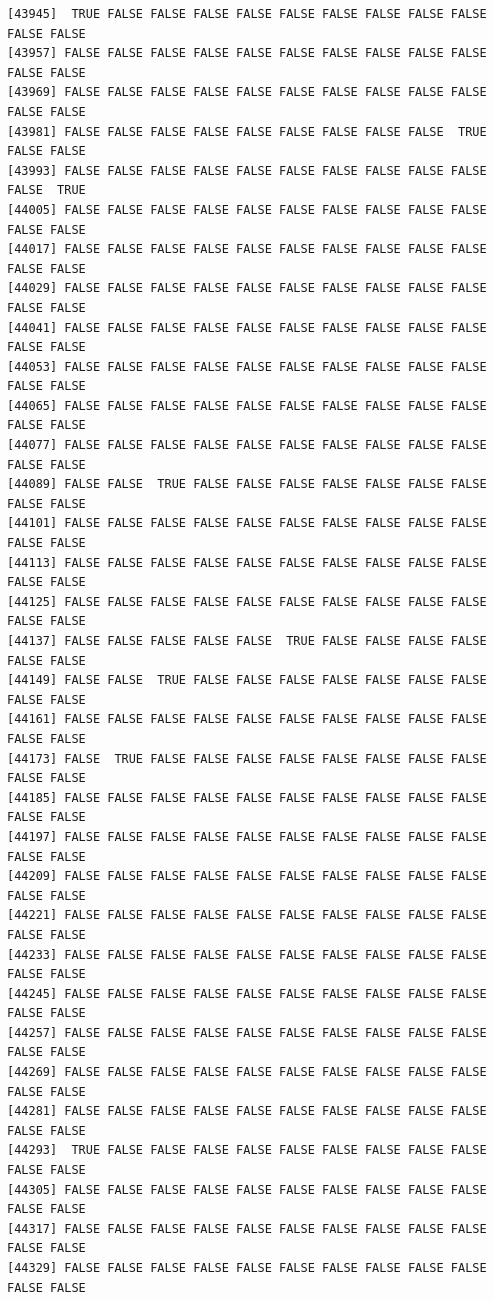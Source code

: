 \documentclass[
  a4paper,
  DIV=11,
  numbers=noendperiod]{scrartcl}
\begin{document}
\begin{verbatim}
[43945]  TRUE FALSE FALSE FALSE FALSE FALSE FALSE FALSE FALSE FALSE FALSE FALSE
[43957] FALSE FALSE FALSE FALSE FALSE FALSE FALSE FALSE FALSE FALSE FALSE FALSE
[43969] FALSE FALSE FALSE FALSE FALSE FALSE FALSE FALSE FALSE FALSE FALSE FALSE
[43981] FALSE FALSE FALSE FALSE FALSE FALSE FALSE FALSE FALSE  TRUE FALSE FALSE
[43993] FALSE FALSE FALSE FALSE FALSE FALSE FALSE FALSE FALSE FALSE FALSE  TRUE
[44005] FALSE FALSE FALSE FALSE FALSE FALSE FALSE FALSE FALSE FALSE FALSE FALSE
[44017] FALSE FALSE FALSE FALSE FALSE FALSE FALSE FALSE FALSE FALSE FALSE FALSE
[44029] FALSE FALSE FALSE FALSE FALSE FALSE FALSE FALSE FALSE FALSE FALSE FALSE
[44041] FALSE FALSE FALSE FALSE FALSE FALSE FALSE FALSE FALSE FALSE FALSE FALSE
[44053] FALSE FALSE FALSE FALSE FALSE FALSE FALSE FALSE FALSE FALSE FALSE FALSE
[44065] FALSE FALSE FALSE FALSE FALSE FALSE FALSE FALSE FALSE FALSE FALSE FALSE
[44077] FALSE FALSE FALSE FALSE FALSE FALSE FALSE FALSE FALSE FALSE FALSE FALSE
[44089] FALSE FALSE  TRUE FALSE FALSE FALSE FALSE FALSE FALSE FALSE FALSE FALSE
[44101] FALSE FALSE FALSE FALSE FALSE FALSE FALSE FALSE FALSE FALSE FALSE FALSE
[44113] FALSE FALSE FALSE FALSE FALSE FALSE FALSE FALSE FALSE FALSE FALSE FALSE
[44125] FALSE FALSE FALSE FALSE FALSE FALSE FALSE FALSE FALSE FALSE FALSE FALSE
[44137] FALSE FALSE FALSE FALSE FALSE  TRUE FALSE FALSE FALSE FALSE FALSE FALSE
[44149] FALSE FALSE  TRUE FALSE FALSE FALSE FALSE FALSE FALSE FALSE FALSE FALSE
[44161] FALSE FALSE FALSE FALSE FALSE FALSE FALSE FALSE FALSE FALSE FALSE FALSE
[44173] FALSE  TRUE FALSE FALSE FALSE FALSE FALSE FALSE FALSE FALSE FALSE FALSE
[44185] FALSE FALSE FALSE FALSE FALSE FALSE FALSE FALSE FALSE FALSE FALSE FALSE
[44197] FALSE FALSE FALSE FALSE FALSE FALSE FALSE FALSE FALSE FALSE FALSE FALSE
[44209] FALSE FALSE FALSE FALSE FALSE FALSE FALSE FALSE FALSE FALSE FALSE FALSE
[44221] FALSE FALSE FALSE FALSE FALSE FALSE FALSE FALSE FALSE FALSE FALSE FALSE
[44233] FALSE FALSE FALSE FALSE FALSE FALSE FALSE FALSE FALSE FALSE FALSE FALSE
[44245] FALSE FALSE FALSE FALSE FALSE FALSE FALSE FALSE FALSE FALSE FALSE FALSE
[44257] FALSE FALSE FALSE FALSE FALSE FALSE FALSE FALSE FALSE FALSE FALSE FALSE
[44269] FALSE FALSE FALSE FALSE FALSE FALSE FALSE FALSE FALSE FALSE FALSE FALSE
[44281] FALSE FALSE FALSE FALSE FALSE FALSE FALSE FALSE FALSE FALSE FALSE FALSE
[44293]  TRUE FALSE FALSE FALSE FALSE FALSE FALSE FALSE FALSE FALSE FALSE FALSE
[44305] FALSE FALSE FALSE FALSE FALSE FALSE FALSE FALSE FALSE FALSE FALSE FALSE
[44317] FALSE FALSE FALSE FALSE FALSE FALSE FALSE FALSE FALSE FALSE FALSE FALSE
[44329] FALSE FALSE FALSE FALSE FALSE FALSE FALSE FALSE FALSE FALSE FALSE FALSE

\end{verbatim}
\end{document}
